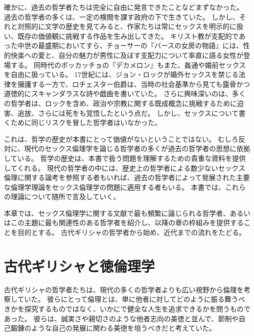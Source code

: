 \documentclass[paper=a4,book,openany]{jlreq} \usepackage{mystyle}
\begin{document}
確かに、過去の哲学者たちは完全に自由に発言できたことなどまずなかった。
過去の哲学者の多くは、一定の検閲を課す政府の下で生きていた。
しかし、それと対照的に文学の歴史を見てみると、作家たちは常にセックスを明示的に扱い、既存の価値観に挑戦する作品を生み出してきた。
キリスト教が支配的であった中世の最盛期においてすら、チョーサーの『バースの女房の物語』には、性的快楽への愛と、自分の魅力が男性に及ぼす支配力について率直に語る女性が登場する。
同時代のボッカッチョの『デカメロン』もまた、姦通や婚前セックスを自由に扱っている。
17世紀には、ジョン・ロックが婚外セックスを禁じる法律を擁護する一方で、ロチェスター伯爵は、当時の社会基準から見ても露骨かつ道徳的にスキャンダラスな詩や戯曲を書いていた。
さらに興味深いのは、多くの哲学者は、ロックを含め、政治や宗教に関する既成概念に挑戦するために迫害、追放、さらには死をも覚悟したという点だ。
しかし、セックスについて書くために同じリスクを冒した哲学者はいなかった。

これは、哲学の歴史が本書にとって価値がないということではない。
むしろ反対に、現代のセックス倫理学を論じる哲学者の多くが過去の哲学者の思想に依拠している。
哲学の歴史は、本書で扱う問題を理解するための貴重な資料を提供してくれる。
現代の哲学者の中には、歴史上の哲学者による数少ないセックス倫理に関する論考を参照する者もいれば、過去の哲学者によって発展された主要な倫理学理論をセックス倫理学の問題に適用する者もいる。
本書では、これらの理論について随所で言及していく。

本章では、セックス倫理学に関する文献で最も頻繁に論じられる哲学者、あるいはこの主題に最も関連性のある哲学者を紹介し、以降の章の枠組みを提供することを目的とする。
古代ギリシャの哲学者から始め、近代までの流れをたどる。

\section{古代ギリシャと徳倫理学}

古代ギリシャの哲学者たちは、現代の多くの哲学者よりも広い視野から倫理を考察していた。
彼らにとって倫理とは、単に他者に対してどのように振る舞うべきかを探究するものではなく、いかにで健全な人生を追求できるかを問うものであった。
彼らは、誠実さや親切さのような他者志向の美徳と並んで、節制や自己鍛錬のような自己の発展に関わる美徳を培うべきだと考えていた。
\end{document}
